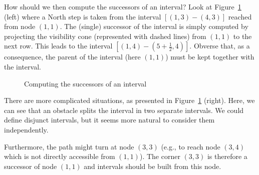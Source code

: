 How should we then compute the successors of an interval?  
Look at Figure~\ref{fig::succ1} (left) 
where a North step is taken from the interval $[(1,3)-(4,3)]$
reached from node $(1,1)$.  
The (single) successor of the interval 
is simply computed by projecting the visibility cone 
(represented with dashed lines)
from $(1,1)$ to the next row.  
This leads to the interval $[(1,4)-(5+\frac{1}{2},4)]$.  
Obverse that, as a consequence, the parent of the interval 
(here $(1,1)$) must be kept together with the interval.  

\begin{figure}[ht]
  \begin{minipage}{0.5\linewidth}
  \begin{center}
    
  \end{center}
  \end{minipage}
  \begin{minipage}{0.5\linewidth}
  \begin{center}
    
  \end{center}
  \end{minipage}
  \caption{Computing the successors of an interval}
  \label{fig::succ1}
\end{figure}

There are more complicated situations, 
as presented in Figure~\ref{fig::succ1} (right).  
Here, we can see that an obstacle splits the interval 
in two separate intervals.  
We could define disjunct intervals, 
but it seems more natural to consider them independently.  

Furthermore, the path might turn at node $(3,3)$
(e.g., to reach node $(3,4)$
which is not directly accessible from $(1,1)$).  
The corner $(3,3)$ is therefore a successor of node $(1,1)$ 
and intervals should be built from this node.  


